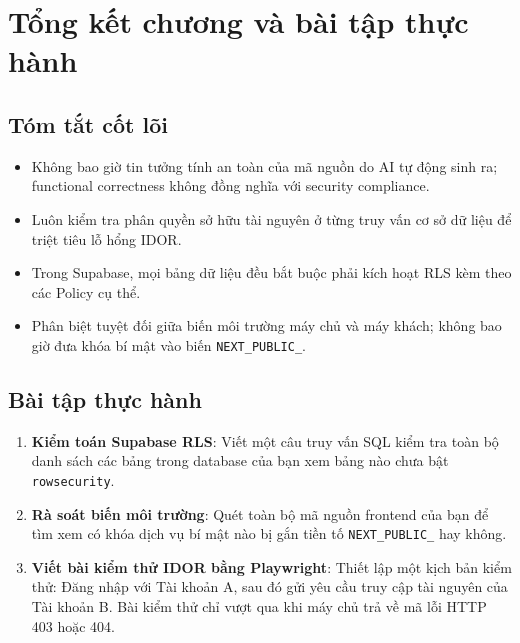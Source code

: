 \documentclass[a4paper,11pt]{article}
\begin{document}
\section{Tổng kết chương và bài tập thực hành}

\subsection{Tóm tắt cốt lõi}
\begin{itemize}[leftmargin=1.5em]
    \item Không bao giờ tin tưởng tính an toàn của mã nguồn do AI tự động sinh ra; functional correctness không đồng nghĩa với security compliance.
    \item Luôn kiểm tra phân quyền sở hữu tài nguyên ở từng truy vấn cơ sở dữ liệu để triệt tiêu lỗ hổng IDOR.
    \item Trong Supabase, mọi bảng dữ liệu đều bắt buộc phải kích hoạt RLS kèm theo các Policy cụ thể.
    \item Phân biệt tuyệt đối giữa biến môi trường máy chủ và máy khách; không bao giờ đưa khóa bí mật vào biến \texttt{NEXT\_PUBLIC\_}.
\end{itemize}

\subsection{Bài tập thực hành}
\begin{enumerate}[label={\arabic*.}]
    \item \textbf{Kiểm toán Supabase RLS}: Viết một câu truy vấn SQL kiểm tra toàn bộ danh sách các bảng trong database của bạn xem bảng nào chưa bật \texttt{rowsecurity}.
    \item \textbf{Rà soát biến môi trường}: Quét toàn bộ mã nguồn frontend của bạn để tìm xem có khóa dịch vụ bí mật nào bị gắn tiền tố \texttt{NEXT\_PUBLIC\_} hay không.
    \item \textbf{Viết bài kiểm thử IDOR bằng Playwright}: Thiết lập một kịch bản kiểm thử: Đăng nhập với Tài khoản A, sau đó gửi yêu cầu truy cập tài nguyên của Tài khoản B. Bài kiểm thử chỉ vượt qua khi máy chủ trả về mã lỗi HTTP 403 hoặc 404.
\end{enumerate}
\end{document}
